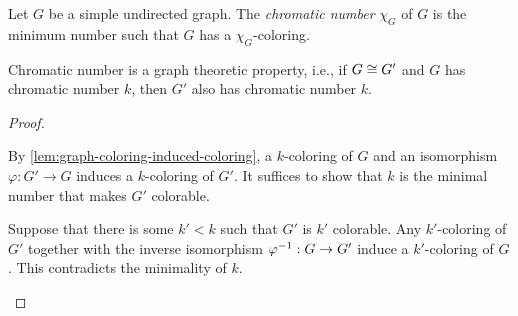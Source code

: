 \documentclass{zett}
\begin{document}
\begin{defn}
  Let $G$ be a simple undirected graph.
  The \emph{chromatic number} $\chi_{G}$ of $G$ is the minimum number such that $G$ has a $\chi_{G}$-coloring.
\end{defn}

\begin{lem}
  Chromatic number is a graph theoretic property, i.e., if $G \cong G'$ and $G$ has chromatic number $k$, then $G'$ also has chromatic number $k$.
\end{lem}
\begin{proof}
  \begin{node}
    By \cref{lem:graph-coloring-induced-coloring}, a $k$-coloring of $G$ and an isomorphism $\varphi : G' \to G$ induces a $k$-coloring of $G'$.
    It suffices to show that $k$ is the minimal number that makes $G'$ colorable.
  \end{node}
  \begin{node}
    Suppose that there is some $k' < k$ such that $G'$ is $k'$ colorable.
    Any $k'$-coloring of $G'$ together with the inverse isomorphism $\varphi^{-1} : G \to G'$ induce a $k'$-coloring of $G$.
    This contradicts the minimality of $k$.
  \end{node}
\end{proof}
\end{document}
